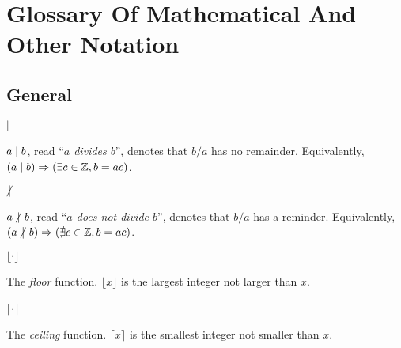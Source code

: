 \chapter{Glossary Of Mathematical And Other Notation}
\label{cglo1}


\section*{General}

\begin{vworkmathtermglossaryenum}

\item {}%
      \mbox{\boldmath $ \mid $}

      $a \mid b$, 
      read ``\emph{$a$ divides $b$}'', denotes that $b/a$ has no remainder.
      Equivalently,
      $(a \mid b) \Rightarrow (\exists c \in {\mathbb{Z}}{}, b = ac)$.

\item {}%
      \mbox{\boldmath $ \hspace{-0.125em}\not\hspace{0.245em}\mid\hspace{0.135em} $}

      $a \hspace{-0.125em}\not\hspace{0.245em}\mid\hspace{0.135em} b$, 
      read ``\emph{$a$ does not divide $b$}'', denotes that $b/a$ has a reminder.
      Equivalently,
      $(a \hspace{-0.125em}\not\hspace{0.245em}\mid\hspace{0.135em} b) \Rightarrow (\nexists c \in {\mathbb{Z}}{}, b = ac)$.

\item {}%
      \mbox{\boldmath $ \lfloor \cdot \rfloor $}

      The \emph{floor} function.  $\lfloor x \rfloor$ is the largest
      integer not larger than $x$.

\item {}%
      \mbox{\boldmath $\lceil \cdot \rceil$ }

      The \emph{ceiling} function.
      $\lceil x \rceil$
      is the smallest integer not smaller than $x$.
\end{vworkmathtermglossaryenum}

